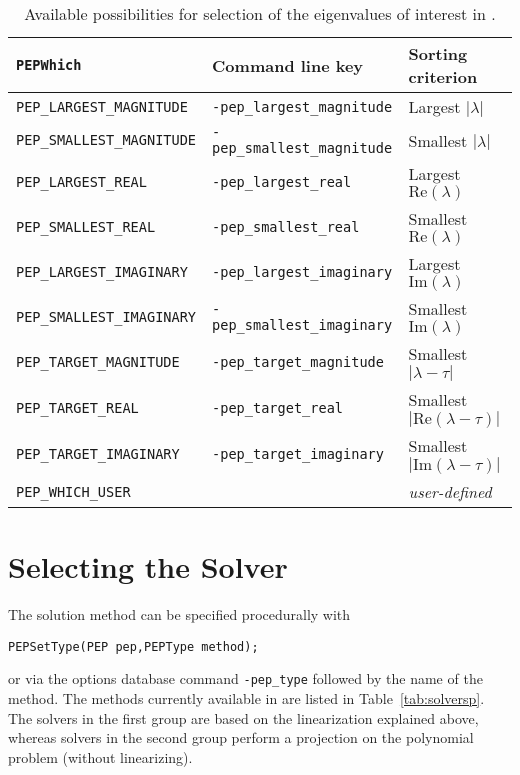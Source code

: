 \begin{table}
\centering
{\small \begin{tabular}{lll}
\texttt{PEPWhich}                  & Command line key                   & Sorting criterion \\\hline
\texttt{PEP\_LARGEST\_MAGNITUDE}   & \texttt{-pep\_largest\_magnitude}  & Largest $|\lambda|$ \\
\texttt{PEP\_SMALLEST\_MAGNITUDE}  & \texttt{-pep\_smallest\_magnitude} & Smallest $|\lambda|$ \\
\texttt{PEP\_LARGEST\_REAL}        & \texttt{-pep\_largest\_real}       & Largest $\mathrm{Re}(\lambda)$ \\
\texttt{PEP\_SMALLEST\_REAL}       & \texttt{-pep\_smallest\_real}      & Smallest $\mathrm{Re}(\lambda)$ \\
\texttt{PEP\_LARGEST\_IMAGINARY}   & \texttt{-pep\_largest\_imaginary}  & Largest $\mathrm{Im}(\lambda)$\footnotemark \\
\texttt{PEP\_SMALLEST\_IMAGINARY}  & \texttt{-pep\_smallest\_imaginary} & Smallest $\mathrm{Im}(\lambda)$\addtocounter{footnote}{-1}\footnotemark \\\hline
\texttt{PEP\_TARGET\_MAGNITUDE}    & \texttt{-pep\_target\_magnitude}   & Smallest $|\lambda-\tau|$ \\
\texttt{PEP\_TARGET\_REAL}         & \texttt{-pep\_target\_real}        & Smallest $|\mathrm{Re}(\lambda-\tau)|$ \\
\texttt{PEP\_TARGET\_IMAGINARY}    & \texttt{-pep\_target\_imaginary}   & Smallest $|\mathrm{Im}(\lambda-\tau)|$ \\\hline
\texttt{PEP\_WHICH\_USER}          &                                    & \emph{user-defined} \\\hline
\end{tabular} }
\caption{\label{tab:portionq}Available possibilities for selection of the eigenvalues of interest in .}
\end{table}


\section{Selecting the Solver}

The solution method can be specified procedurally with
	\begin{Verbatim}[fontsize=\small]
	PEPSetType(PEP pep,PEPType method);
	\end{Verbatim}
or via the options database command \Verb!-pep_type! followed by the name of the method. The methods currently available in  are listed in Table~\ref{tab:solversp}. The solvers in the first group are based on the linearization explained above, whereas solvers in the second group perform a projection on the polynomial problem (without linearizing).

